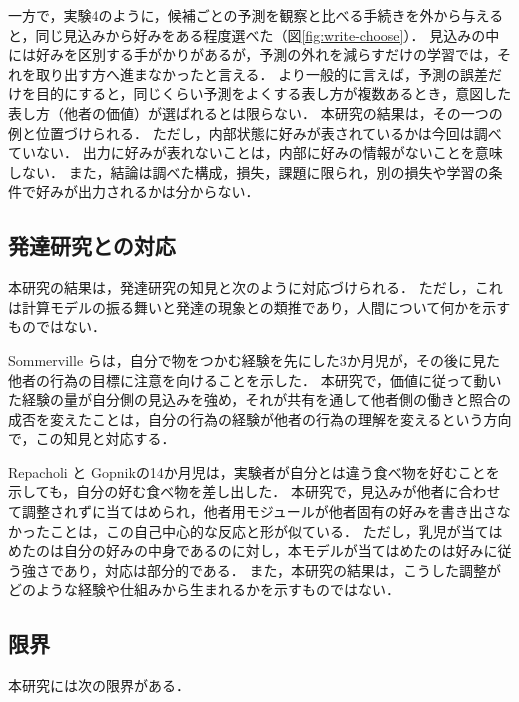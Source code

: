 一方で，実験4のように，候補ごとの予測を観察と比べる手続きを外から与えると，同じ見込みから好みをある程度選べた（図\ref{fig:write-choose}）．
見込みの中には好みを区別する手がかりがあるが，予測の外れを減らすだけの学習では，それを取り出す方へ進まなかったと言える．
より一般的に言えば，予測の誤差だけを目的にすると，同じくらい予測をよくする表し方が複数あるとき，意図した表し方（他者の価値）が選ばれるとは限らない．
本研究の結果は，その一つの例と位置づけられる．
ただし，内部状態に好みが表されているかは今回は調べていない．
出力に好みが表れないことは，内部に好みの情報がないことを意味しない．
また，結論は調べた構成，損失，課題に限られ，別の損失や学習の条件で好みが出力されるかは分からない．

\subsection{発達研究との対応}\label{sec:disc-dev}
本研究の結果は，発達研究の知見と次のように対応づけられる．
ただし，これは計算モデルの振る舞いと発達の現象との類推であり，人間について何かを示すものではない．

Sommerville ら\cite{sommerville2005action}は，自分で物をつかむ経験を先にした3か月児が，その後に見た他者の行為の目標に注意を向けることを示した．
本研究で，価値に従って動いた経験の量が自分側の見込みを強め，それが共有を通して他者側の働きと照合の成否を変えたことは，自分の行為の経験が他者の行為の理解を変えるという方向で，この知見と対応する．

Repacholi と Gopnik\cite{repacholi1997early}の14か月児は，実験者が自分とは違う食べ物を好むことを示しても，自分の好む食べ物を差し出した．
本研究で，見込みが他者に合わせて調整されずに当てはめられ，他者用モジュールが他者固有の好みを書き出さなかったことは，この自己中心的な反応と形が似ている．
ただし，乳児が当てはめたのは自分の好みの中身であるのに対し，本モデルが当てはめたのは好みに従う強さであり，対応は部分的である．
また，本研究の結果は，こうした調整がどのような経験や仕組みから生まれるかを示すものではない．

\subsection{限界}\label{sec:limitations}
本研究には次の限界がある．

